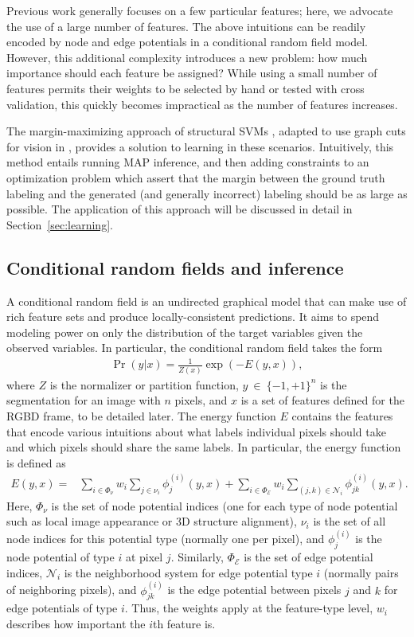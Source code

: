 \documentclass[graybox]{svmult}
\begin{document}
Previous work generally focuses on a few particular features; here, we advocate the use of a large number of features.  The above intuitions can be readily encoded by node and edge potentials in a conditional random field model.  However, this additional complexity introduces a new problem: how much importance should each feature be assigned?  While using a small number of features permits their weights to be selected by hand or tested with cross validation, this quickly becomes impractical as the number of features increases.

The margin-maximizing approach of structural SVMs \cite{taskar2005a, tsochantaridis2005a}, adapted to use graph cuts for vision in \cite{szummer2008a}, provides a solution to learning in these scenarios.  Intuitively, this method entails running MAP inference, and then adding constraints to an optimization problem which assert that the margin between the ground truth labeling and the generated (and generally incorrect) labeling should be as large as possible.  The application of this approach will be discussed in detail in Section~\ref{sec:learning}.


\subsection{Conditional random fields and inference}
\label{sec:inference}

A conditional random field is an undirected graphical model that can make use of rich feature sets and produce locally-consistent predictions.  It aims to spend modeling power on only the distribution of the target variables given the observed variables.  In particular, the conditional random field takes the form
\begin{align}
  \Pr(y | x) = \frac{1}{Z(x)} \exp(-E(y, x)),
\end{align}
where $Z$ is the normalizer or partition function, $y~\in~\{-1,+1\}^n$ is the segmentation for an image with $n$ pixels, and $x$ is a set of features defined for the RGBD frame, to be detailed later.  The energy function $E$ contains the features that encode various intuitions about what labels individual pixels should take and which pixels should share the same labels.  In particular, the energy function is defined as
\begin{align}
  E(y, x) = & \sum_{i \in \Phi_\nu} w_i \sum_{j \in \nu_i} \phi_j^{(i)}(y, x) \label{eqn:energy} + \sum_{i \in \Phi_{\mathcal{E}}} w_i \sum_{(j,k) \in \mathcal{N}_i}  \phi_{jk}^{(i)}(y, x).
\end{align}
Here, $\Phi_\nu$ is the set of node potential indices (\ie one for each type of node potential such as local image appearance or 3D structure alignment), $\nu_i$ is the set of all node indices for this potential type (normally one per pixel), and $\phi_j^{(i)}$ is the node potential of type $i$ at pixel $j$.  Similarly, $\Phi_\mathcal{E}$ is the set of edge potential indices, $\mathcal{N}_i$ is the neighborhood system for edge potential type $i$ (normally pairs of neighboring pixels), and $\phi_{jk}^{(i)}$ is the edge potential between pixels $j$ and $k$ for edge potentials of type $i$.  Thus, the weights apply at the feature-type level, \ie $w_i$ describes how important the $i$th feature is.
\end{document}
